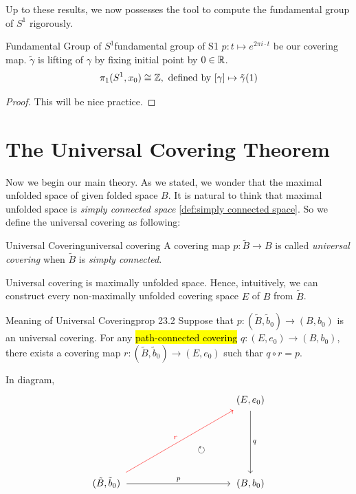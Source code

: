 \documentclass[12pt, a4paper, twoside]{article}
\theoremstyle{plain}
\begin{document}
Up to these results, we now possesses the tool to compute the fundamental group of $S^1$ rigorously. 

\begin{thm}{Fundamental Group of $S^1$}{fundamental group of S1}
    $p: t \mapsto e^{2\pi i \cdot t}$ be our covering map. $\tilde{\gamma}$ is lifting of $\gamma$ by fixing initial point by $0 \in {\mathbb {R}}$.
    \[ \pi_1(S^1, x_0) \cong {\mathbb {Z}} , \text{ defined by } [\gamma] \mapsto \tilde{\gamma}(1)\]
\end{thm}

\begin{proof}
    This will be nice practice.
\end{proof}

\newpage 

\section{The Universal Covering Theorem}

Now we begin our main theory. As we stated, we wonder that the maximal unfolded space of given folded space $B$. 
It is natural to think that maximal unfolded space is \textit{simply connected space} \ref{def:simply connected space}. 
So we define the universal covering as following: 

\begin{defn}{Universal Covering}{universal covering}
    A covering map $p: \tilde{B} \rightarrow B$ is called \textit{universal covering} 
    when $\tilde{B}$ is \textit{simply connected}. 
\end{defn}

Universal covering is maximally unfolded space. Hence, intuitively, we can construct 
every non-maximally unfolded covering space $E$ of $B$ from $\tilde{B}$. 

\begin{prop}{Meaning of Universal Covering}{prop 23.2}
    Suppose that $p: (\tilde{B}, \tilde{b}_0) \rightarrow (B, b_0)$ is an universal covering. 
    For any \hl{path-connected covering} $q: (E, e_0) \rightarrow (B, b_0)$, 
    there exists a covering map $r: (\tilde{B}, \tilde{b}_0) \rightarrow (E, e_0)$ 
    such thar $q \circ r = p$. 
\end{prop}

In diagram, 
\[
\begin{tikzcd}
    & & & & (E, e_0) \arrow[ddd, "q", shorten >= 2pt, shorten <= 2pt]\\
    & & & & \\
    & & & \circlearrowright & \\
    (\tilde{B}, \tilde{b}_0) \arrow[rrrruuu, "r", red, shorten >= 3pt, shorten <= 3pt]\arrow[rrrr, "p", shorten >= 2pt, shorten <= 2pt] & &  & & (B, b_0)
\end{tikzcd}
\]
\end{document}
